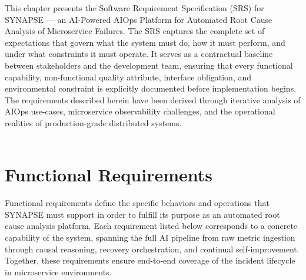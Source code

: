 
\hspace*{0.3in} This chapter presents the Software Requirement Specification (SRS) for SYNAPSE — an AI-Powered AIOps Platform for Automated Root Cause Analysis of Microservice Failures. The SRS captures the complete set of expectations that govern what the system must do, how it must perform, and under what constraints it must operate. It serves as a contractual baseline between stakeholders and the development team, ensuring that every functional capability, non-functional quality attribute, interface obligation, and environmental constraint is explicitly documented before implementation begins. The requirements described herein have been derived through iterative analysis of AIOps use-cases, microservice observability challenges, and the operational realities of production-grade distributed systems.\\\\

\section{Functional Requirements}

\hspace*{0.3in} Functional requirements define the specific behaviors and operations that SYNAPSE must support in order to fulfill its purpose as an automated root cause analysis platform. Each requirement listed below corresponds to a concrete capability of the system, spanning the full AI pipeline from raw metric ingestion through causal reasoning, recovery orchestration, and continual self-improvement. Together, these requirements ensure end-to-end coverage of the incident lifecycle in microservice environments.\\\\

